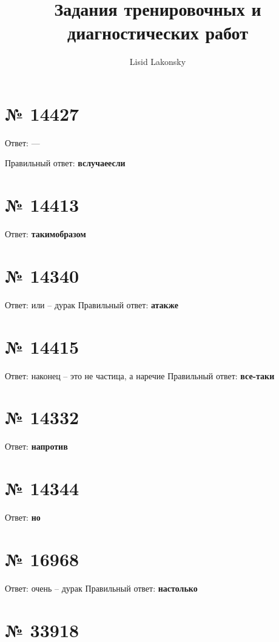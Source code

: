 \documentclass[11pt]{article} %
\title{Задания тренировочных и диагностических работ}
\author{Lisid Lakonsky}
\begin{document}
\maketitle

\section{№ \textbf{14427}}

Ответ: ---

Правильный ответ: \textbf{вслучаеесли}

\section{№ \textbf{14413}}

Ответ: \textbf{такимобразом}

\section{№ \textbf{14340}}

Ответ: или -- дурак
Правильный ответ: \textbf{атакже}

\section{№ \textbf{14415}}

Ответ: наконец -- это не частица, а наречие
Правильный ответ: \textbf{все-таки}

\section{№ \textbf{14332}}

Ответ: \textbf{напротив}

\section{№ \textbf{14344}}

Ответ: \textbf{но}

\section{№ \textbf{16968}}

Ответ: очень -- дурак
Правильный ответ: \textbf{настолько}

\section{№ \textbf{33918}}
\end{document}
